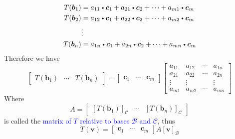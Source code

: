\documentclass{beamer}
\newcommand{\fatdot}{\mathrel{\raisebox{0.25ex}{\tikz\filldraw[black,x=2pt,y=2pt] (0,0) circle (0.5);}}}
\theoremstyle{definition}
\theoremstyle{remark}
\begin{document}
\begin{frame}[t]
\begin{align*}
T(\bm b_1)&=a_{11}\fatdot\bm c_1+a_{21}\fatdot\bm c_2+\cdots+a_{m1}\fatdot\bm c_m\\
T(\bm b_2)&=a_{12}\fatdot\bm c_1+a_{22}\fatdot\bm c_2+\cdots+a_{m2}\fatdot\bm c_m\\
&\vdots\\
T(\bm b_n)&=a_{1n}\fatdot\bm c_1+a_{2n}\fatdot\bm c_2+\cdots+a_{mn}\fatdot\bm c_m
\end{align*}\pause
Therefore we have
\begin{equation}\label{13:44-06/28/2022}
\begin{bmatrix}
T(\bm b_1)&\cdots&T(\bm b_n)
\end{bmatrix}=\begin{bmatrix}
\bm c_1&\cdots&\bm c_m
\end{bmatrix}\begin{bmatrix}
a_{11}&a_{12}&\cdots&a_{1n}\\
a_{21}&a_{22}&\cdots&a_{2n}\\
\vdots&\vdots&&\vdots\\
a_{m1}&a_{m2}&\cdots&a_{mn}
\end{bmatrix}
\end{equation}\pause
Where
\begin{equation}\label{12:55-06/29/2022}
A=\begin{bmatrix}
[T(\bm b_1)]_{\mathcal C}&\cdots&[T(\bm b_n)]_{\mathcal C}
\end{bmatrix}
\end{equation}
is called the \textcolor{blue}{matrix of $T$ relative to bases $\mathcal B$ and $\mathcal C$}\pause, thus
\[
T(\bm v)=\begin{bmatrix}
\bm c_1&\cdots&\bm c_m
\end{bmatrix}A[\bm v]_{\mathcal B}
\]
\end{frame}
\end{document}
